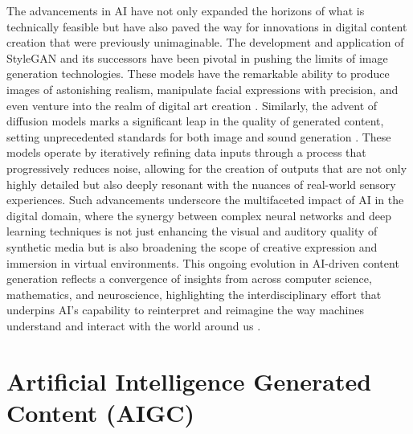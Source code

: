\documentclass[11pt,a4paper,oneside]{report}
\begin{document}
The advancements in AI have not only expanded the horizons of what is technically feasible but have also paved the way for innovations in digital content creation that were previously unimaginable. 
The development and application of StyleGAN \cite{karras2019style} and its successors have been pivotal in pushing the limits of image generation technologies. 
These models have the remarkable ability to produce images of astonishing realism, manipulate facial expressions with precision, and even venture into the realm of digital art creation \cite{patashnik2021styleclip}. 
Similarly, the advent of diffusion models marks a significant leap in the quality of generated content, setting unprecedented standards for both image and sound generation \cite{rombach2022high}. 
These models operate by iteratively refining data inputs through a process that progressively reduces noise, allowing for the creation of outputs that are not only highly detailed but also deeply resonant with the nuances of real-world sensory experiences. 
Such advancements underscore the multifaceted impact of AI in the digital domain, where the synergy between complex neural networks and deep learning techniques is not just enhancing the visual and auditory quality of synthetic media but is also broadening the scope of creative expression and immersion in virtual environments. 
This ongoing evolution in AI-driven content generation reflects a convergence of insights from across computer science, mathematics, and neuroscience, highlighting the interdisciplinary effort that underpins AI's capability to reinterpret and reimagine the way machines understand and interact with the world around us \cite{silver2016mastering}.

\section{Artificial Intelligence Generated Content (AIGC)}
\end{document}
